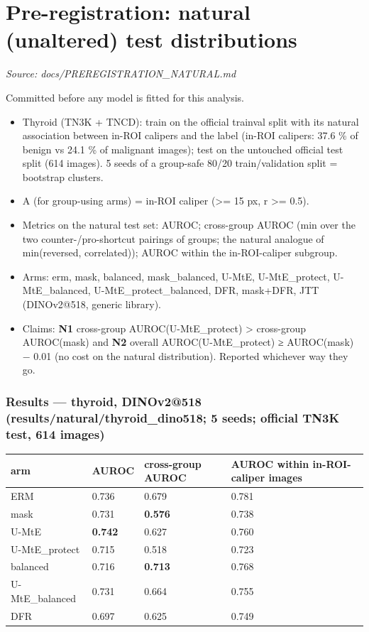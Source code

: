 \section{Pre-registration: natural (unaltered) test distributions}\label{doc:PREREGISTRATION_NATURAL}
\noindent\textit{Source: docs/PREREGISTRATION\_NATURAL.md}

{\small
Committed before any model is fitted for this analysis.

\begin{itemize}

\item
  Thyroid (TN3K + TNCD): train on the official trainval split with its natural association between in-ROI calipers
  and the label (in-ROI calipers: 37.6 \% of benign vs 24.1 \% of malignant images); test on the untouched official
  test split (614 images). 5 seeds of a group-safe 80/20 train/validation split = bootstrap clusters.
\item
  A (for group-using arms) = in-ROI caliper (\textgreater= 15 px, r \textgreater= 0.5).
\item
  Metrics on the natural test set: AUROC; cross-group AUROC (min over the two counter-/pro-shortcut pairings of
  groups; the natural analogue of min(reversed, correlated)); AUROC within the in-ROI-caliper subgroup.
\item
  Arms: erm, mask, balanced, mask\_balanced, U-MtE, U-MtE\_protect, U-MtE\_balanced, U-MtE\_protect\_balanced, DFR,
  mask+DFR, JTT (DINOv2@518, generic library).
\item
  Claims: \textbf{N1} cross-group AUROC(U-MtE\_protect) \textgreater{} cross-group AUROC(mask) and \textbf{N2} overall AUROC(U-MtE\_protect)
  ≥ AUROC(mask) − 0.01 (no cost on the natural distribution). Reported whichever way they go.
\end{itemize}

\subsubsection{Results --- thyroid, DINOv2@518 (results/natural/thyroid\_dino518; 5 seeds; official TN3K test, 614 images)}\label{results--thyroid-dinov2518-resultsnaturalthyroid_dino518-5-seeds-official-tn3k-test-614-images}

{ %
\begin{longtable}[]{@{}llll@{}}
\toprule\noalign{}
arm & AUROC & cross-group AUROC & AUROC within in-ROI-caliper images \\
\midrule\noalign{}
\endhead
\bottomrule\noalign{}
\endlastfoot
ERM & 0.736 & 0.679 & 0.781 \\
mask & 0.731 & \textbf{0.576} & 0.738 \\
U-MtE & \textbf{0.742} & 0.627 & 0.760 \\
U-MtE\_protect & 0.715 & 0.518 & 0.723 \\
balanced & 0.716 & \textbf{0.713} & 0.768 \\
U-MtE\_balanced & 0.731 & 0.664 & 0.755 \\
DFR & 0.697 & 0.625 & 0.749 \\
\end{longtable}
}

}
